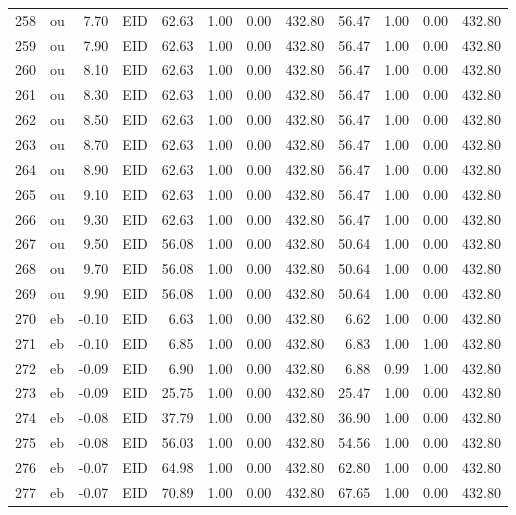 \begin{table}[ht]
\begin{tabular}{rlrlrrrrrrrr}
  258 & ou & 7.70 & EID & 62.63 & 1.00 & 0.00 & 432.80 & 56.47 & 1.00 & 0.00 & 432.80 \\ 
  259 & ou & 7.90 & EID & 62.63 & 1.00 & 0.00 & 432.80 & 56.47 & 1.00 & 0.00 & 432.80 \\ 
  260 & ou & 8.10 & EID & 62.63 & 1.00 & 0.00 & 432.80 & 56.47 & 1.00 & 0.00 & 432.80 \\ 
  261 & ou & 8.30 & EID & 62.63 & 1.00 & 0.00 & 432.80 & 56.47 & 1.00 & 0.00 & 432.80 \\ 
  262 & ou & 8.50 & EID & 62.63 & 1.00 & 0.00 & 432.80 & 56.47 & 1.00 & 0.00 & 432.80 \\ 
  263 & ou & 8.70 & EID & 62.63 & 1.00 & 0.00 & 432.80 & 56.47 & 1.00 & 0.00 & 432.80 \\ 
  264 & ou & 8.90 & EID & 62.63 & 1.00 & 0.00 & 432.80 & 56.47 & 1.00 & 0.00 & 432.80 \\ 
  265 & ou & 9.10 & EID & 62.63 & 1.00 & 0.00 & 432.80 & 56.47 & 1.00 & 0.00 & 432.80 \\ 
  266 & ou & 9.30 & EID & 62.63 & 1.00 & 0.00 & 432.80 & 56.47 & 1.00 & 0.00 & 432.80 \\ 
  267 & ou & 9.50 & EID & 56.08 & 1.00 & 0.00 & 432.80 & 50.64 & 1.00 & 0.00 & 432.80 \\ 
  268 & ou & 9.70 & EID & 56.08 & 1.00 & 0.00 & 432.80 & 50.64 & 1.00 & 0.00 & 432.80 \\ 
  269 & ou & 9.90 & EID & 56.08 & 1.00 & 0.00 & 432.80 & 50.64 & 1.00 & 0.00 & 432.80 \\ 
  270 & eb & -0.10 & EID & 6.63 & 1.00 & 0.00 & 432.80 & 6.62 & 1.00 & 0.00 & 432.80 \\ 
  271 & eb & -0.10 & EID & 6.85 & 1.00 & 0.00 & 432.80 & 6.83 & 1.00 & 1.00 & 432.80 \\ 
  272 & eb & -0.09 & EID & 6.90 & 1.00 & 0.00 & 432.80 & 6.88 & 0.99 & 1.00 & 432.80 \\ 
  273 & eb & -0.09 & EID & 25.75 & 1.00 & 0.00 & 432.80 & 25.47 & 1.00 & 0.00 & 432.80 \\ 
  274 & eb & -0.08 & EID & 37.79 & 1.00 & 0.00 & 432.80 & 36.90 & 1.00 & 0.00 & 432.80 \\ 
  275 & eb & -0.08 & EID & 56.03 & 1.00 & 0.00 & 432.80 & 54.56 & 1.00 & 0.00 & 432.80 \\ 
  276 & eb & -0.07 & EID & 64.98 & 1.00 & 0.00 & 432.80 & 62.80 & 1.00 & 0.00 & 432.80 \\ 
  277 & eb & -0.07 & EID & 70.89 & 1.00 & 0.00 & 432.80 & 67.65 & 1.00 & 0.00 & 432.80 \\ 

\end{tabular}
\end{table}
